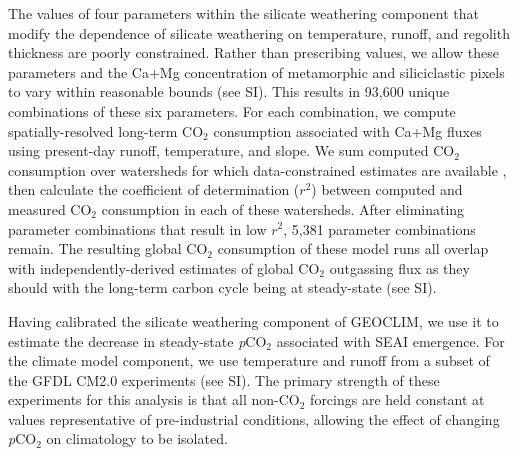 \documentclass[11pt,letterpaper]{article}
\newcommand{\pCOtwo}{\textit{p}CO$_{2}$\xspace}
\newcommand{\COtwo}{CO$_{2}$\xspace}
\begin{document}
The values of four parameters within the silicate weathering component that modify the dependence of silicate weathering on temperature, runoff, and regolith thickness are poorly constrained. Rather than prescribing values, we allow these parameters and the Ca+Mg concentration of metamorphic and siliciclastic pixels to vary within reasonable bounds (see SI). This results in 93,600 unique combinations of these six parameters. For each combination, we compute spatially-resolved long-term \COtwo consumption associated with Ca+Mg fluxes using present-day runoff, temperature, and slope. We sum computed \COtwo consumption over watersheds for which data-constrained estimates are available \cite{Gaillardet1999a, Moquet2018a}, then calculate the coefficient of determination ($r^{2}$) between computed and measured \COtwo consumption in each of these watersheds. After eliminating parameter combinations that result in low $r^{2}$, 5,381 parameter combinations remain. The resulting global \COtwo consumption of these model runs all overlap with independently-derived estimates of global \COtwo outgassing flux as they should with the long-term carbon cycle being at steady-state (see SI).

Having calibrated the silicate weathering component of GEOCLIM, we use it to estimate the decrease in steady-state \pCOtwo associated with SEAI emergence. For the climate model component, we use temperature and runoff from a subset of the GFDL CM2.0 experiments \cite{Delworth2006b} (see SI). The primary strength of these experiments for this analysis is that all non-\COtwo forcings are held constant at values representative of pre-industrial conditions, allowing the effect of changing \pCOtwo on climatology to be isolated.
\end{document}
